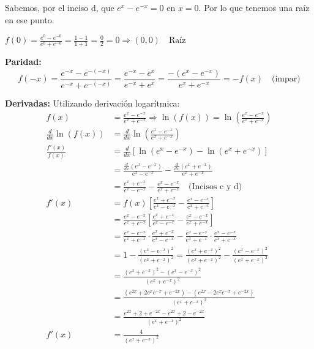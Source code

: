 \documentclass[12pt]{article}
\begin{document}
\begin{enumerate}[\hspace{9px} a)]
            Sabemos, por el inciso d, que \(e^x-e^{-x}=0\) en \(x=0\). Por lo que tenemos una ra\'iz en ese punto.\medskip

            \(f(0)=\frac{e^0-e^{-0}}{e^0+e^{-0}} = \frac{1-1}{1+1} = \frac{0}{2} = 0 \Longrightarrow (0,0) \quad \text{Raíz}\)

        \textbf{Paridad: }
            \begin{equation*}
                f(-x) = \frac{e^{-x}-e^{-(-x)}}{e^{-x}+e^{-(-x)}} = \frac{e^{-x}-e^x}{e^{-x}+e^x} = \frac{-(e^x-e^{-x})}{e^x+e^{-x}} = -f(x) \quad \text{(impar)}
            \end{equation*}

        \textbf{Derivadas: } \quad Utilizando derivaci\'on logar\'itmica:
            \begin{align*}
                f(x) &= \frac{e^x-e^{-x}}{e^x+e^{-x}} \Longrightarrow \ln(f(x)) = \ln\left(\frac{e^x-e^{-x}}{e^x+e^{-x}}\right)\\
                \frac{d}{dx}\ln(f(x))&=\frac{d}{dx}\ln\left(\frac{e^x-e^{-x}}{e^x+e^{-x}}\right)\\
                \frac{f'(x)}{f(x)}&=\frac{d}{dx}\left[\ln(e^x-e^{-x})-\ln(e^x+e^{-x})\right]\\
                &=\frac{\frac{d}{dx}(e^x-e^{-x})}{e^x-e^{-x}}-\frac{\frac{d}{dx}(e^x+e^{-x})}{e^x+e^{-x}}\\
                &=\frac{e^x+e^{-x}}{e^x-e^{-x}}-\frac{e^x-e^{-x}}{e^x+e^{-x}} \quad \text{(Incisos c y d)}\\
                f'(x)&= f(x)\left[\frac{e^x+e^{-x}}{e^x-e^{-x}}-\frac{e^x-e^{-x}}{e^x+e^{-x}}\right]\\
                &= \frac{e^x-e^{-x}}{e^x+e^{-x}}\left[\frac{e^x+e^{-x}}{e^x-e^{-x}}-\frac{e^x-e^{-x}}{e^x+e^{-x}}\right]\\
                &= \frac{e^x-e^{-x}}{e^x+e^{-x}}\cdot\frac{e^x+e^{-x}}{e^x-e^{-x}} - \frac{e^x-e^{-x}}{e^x+e^{-x}}\cdot\frac{e^x-e^{-x}}{e^x+e^{-x}}\\
                &= 1- \frac{(e^x-e^{-x})^2}{(e^x+e^{-x})^2} = \frac{(e^x+e^{-x})^2}{(e^x+e^{-x})^2} - \frac{(e^x-e^{-x})^2}{(e^x+e^{-x})^2}\\
                &= \frac{(e^x+e^{-x})^2-(e^x-e^{-x})^2}{(e^x+e^{-x})^2}\\
                &= \frac{(e^{2x}+2e^xe^{-x}+e^{-2x})-(e^{2x}-2e^xe^{-x}+e^{-2x})}{(e^x+e^{-x})^2}\\
                &= \frac{e^{2x}+2+e^{-2x}-e^{2x}+2-e^{-2x}}{(e^x+e^{-x})^2}\\
                f'(x)&= \frac{4}{(e^x+e^{-x})^2}
            \end{align*}


\end{enumerate}
\end{document}
